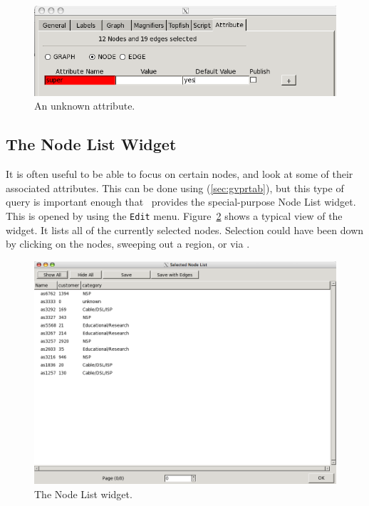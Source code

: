 \begin{figure}[ht]
\begin{center}
\includegraphics[scale=.5]{figures/attr4.png}
\caption{\small An unknown attribute.}
\label{fig:attr4}
\end{center}
\end{figure}

\subsection{The Node List Widget}
\label{sec:nodelist}
It is often useful to be able to focus on certain nodes, and look at some of their associated attributes. 
This can be done using \gvpr (\ref{sec:gvprtab}), but this type of query is important enough that \smyrna\
provides the special-purpose Node List widget. This is opened by using the {\tt Edit} menu.
Figure~\ref{fig:nodelist} shows a typical view of the widget. It lists all of the currently selected nodes.
Selection could have been down by clicking on the nodes, sweeping out a region, or via \gvpr.
\begin{figure}[ht]
\begin{center}
\includegraphics[scale=.35]{figures/nodelist.png}
\caption{\small The Node List widget.}
\label{fig:nodelist}
\end{center}
\end{figure}
